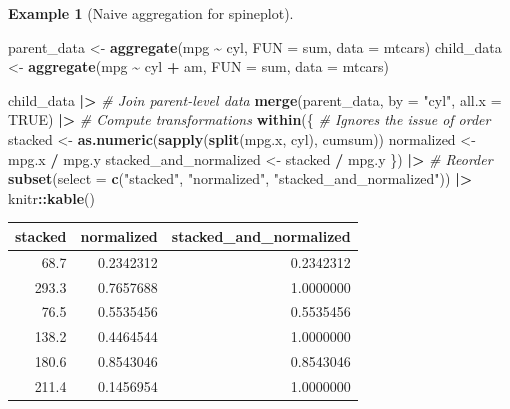 \documentclass[
  openany]{book}
\newenvironment{Shaded}{\begin{snugshade}}{\end{snugshade}}
\newcommand{\AttributeTok}[1]{\textcolor[rgb]{0.13,0.29,0.53}{#1}}
\newcommand{\CommentTok}[1]{\textcolor[rgb]{0.56,0.35,0.01}{\textit{#1}}}
\newcommand{\ConstantTok}[1]{\textcolor[rgb]{0.56,0.35,0.01}{#1}}
\newcommand{\FunctionTok}[1]{\textcolor[rgb]{0.13,0.29,0.53}{\textbf{#1}}}
\newcommand{\NormalTok}[1]{#1}
\newcommand{\OtherTok}[1]{\textcolor[rgb]{0.56,0.35,0.01}{#1}}
\newcommand{\SpecialCharTok}[1]{\textcolor[rgb]{0.81,0.36,0.00}{\textbf{#1}}}
\newcommand{\StringTok}[1]{\textcolor[rgb]{0.31,0.60,0.02}{#1}}
\theoremstyle{definition}
\theoremstyle{definition}
\newtheorem{example}{Example}[chapter]
\theoremstyle{definition}
\theoremstyle{definition}
\theoremstyle{remark}
\begin{document}
\begin{example}[Naive aggregation for spineplot]
\protect\hypertarget{exm:spineplot-code}{}\label{exm:spineplot-code}\leavevmode

\begin{Shaded}
\begin{Highlighting}[]
\NormalTok{parent\_data }\OtherTok{\textless{}{-}} \FunctionTok{aggregate}\NormalTok{(mpg }\SpecialCharTok{\textasciitilde{}}\NormalTok{ cyl, }\AttributeTok{FUN =}\NormalTok{ sum, }\AttributeTok{data =}\NormalTok{ mtcars)}
\NormalTok{child\_data }\OtherTok{\textless{}{-}} \FunctionTok{aggregate}\NormalTok{(mpg }\SpecialCharTok{\textasciitilde{}}\NormalTok{ cyl }\SpecialCharTok{+}\NormalTok{ am, }\AttributeTok{FUN =}\NormalTok{ sum, }\AttributeTok{data =}\NormalTok{ mtcars)}

\NormalTok{child\_data }\SpecialCharTok{|\textgreater{}}
  \CommentTok{\# Join parent{-}level data}
  \FunctionTok{merge}\NormalTok{(parent\_data, }\AttributeTok{by =} \StringTok{"cyl"}\NormalTok{, }\AttributeTok{all.x =} \ConstantTok{TRUE}\NormalTok{) }\SpecialCharTok{|\textgreater{}} 
  \CommentTok{\# Compute transformations}
  \FunctionTok{within}\NormalTok{(\{                 }
    \CommentTok{\# Ignores the issue of order}
\NormalTok{    stacked }\OtherTok{\textless{}{-}} \FunctionTok{as.numeric}\NormalTok{(}\FunctionTok{sapply}\NormalTok{(}\FunctionTok{split}\NormalTok{(mpg.x, cyl), cumsum)) }
\NormalTok{    normalized }\OtherTok{\textless{}{-}}\NormalTok{ mpg.x }\SpecialCharTok{/}\NormalTok{ mpg.y}
\NormalTok{    stacked\_and\_normalized }\OtherTok{\textless{}{-}}\NormalTok{ stacked }\SpecialCharTok{/}\NormalTok{ mpg.y}
\NormalTok{  \}) }\SpecialCharTok{|\textgreater{}}
  \CommentTok{\# Reorder}
  \FunctionTok{subset}\NormalTok{(}\AttributeTok{select =} \FunctionTok{c}\NormalTok{(}\StringTok{"stacked"}\NormalTok{, }\StringTok{"normalized"}\NormalTok{, }
                    \StringTok{"stacked\_and\_normalized"}\NormalTok{)) }\SpecialCharTok{|\textgreater{}}
\NormalTok{  knitr}\SpecialCharTok{::}\FunctionTok{kable}\NormalTok{()}
\end{Highlighting}
\end{Shaded}

\begin{tabular}{r|r|r}
\hline
stacked & normalized & stacked\_and\_normalized\\
\hline
68.7 & 0.2342312 & 0.2342312\\
\hline
293.3 & 0.7657688 & 1.0000000\\
\hline
76.5 & 0.5535456 & 0.5535456\\
\hline
138.2 & 0.4464544 & 1.0000000\\
\hline
180.6 & 0.8543046 & 0.8543046\\
\hline
211.4 & 0.1456954 & 1.0000000\\
\hline
\end{tabular}

\end{example}
\end{document}
